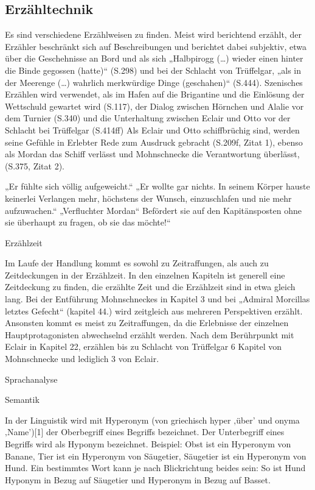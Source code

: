 \subsection{Erzähltechnik}

Es sind verschiedene Erzählweisen zu finden. Meist wird berichtend erzählt, der Erzähler beschränkt sich auf Beschreibungen und berichtet dabei  subjektiv, etwa über die Geschehnisse an Bord und als sich „Halbpirogg (…) wieder einen hinter die Binde gegossen (hatte)“ (S.298) und bei der Schlacht von Trüffelgar, „als in der Meerenge (…) wahrlich merkwürdige Dinge (geschahen)“ (S.444). Szenisches Erzählen wird verwendet, als im Hafen auf die Brigantine und die Einlösung der Wettschuld gewartet wird (S.117), der Dialog zwischen Hörnchen und Alalie vor dem Turnier (S.340) und die Unterhaltung zwischen Eclair und Otto vor der Schlacht bei Trüffelgar (S.414ff) Als Eclair und Otto schiffbrüchig sind, werden seine Gefühle in Erlebter Rede zum Ausdruck gebracht (S.209f, Zitat 1), ebenso als Mordan das Schiff verlässt und Mohnschnecke die Verantwortung überlässt,(S.375, Zitat 2).


„Er fühlte sich völlig aufgeweicht.“ „Er wollte gar nichts. In seinem Körper hauste keinerlei Verlangen mehr, höchstens der Wunsch, einzuschlafen und nie mehr aufzuwachen.“
„Verfluchter Mordan“ Befördert sie auf den Kapitänsposten ohne sie überhaupt zu fragen, ob sie das möchte!“

Erzählzeit

Im Laufe der Handlung kommt es sowohl zu Zeitraffungen, als auch zu Zeitdeckungen in der Erzählzeit. In den einzelnen Kapiteln ist generell eine Zeitdeckung zu finden, die erzählte Zeit und die Erzählzeit sind in etwa gleich lang. Bei der Entführung Mohnschneckes in Kapitel 3 und bei „Admiral Morcillas letztes Gefecht“ (kapitel 44.) wird zeitgleich aus mehreren Perspektiven erzählt. Ansonsten kommt es meist zu Zeitraffungen, da die Erlebnisse der einzelnen Hauptprotagonisten abwechselnd erzählt werden.  Nach dem Berührpunkt mit Eclair in Kapitel 22, erzählen bis zu Schlacht von Trüffelgar 6 Kapitel von Mohnschnecke und lediglich 3 von Eclair.

Sprachanalyse
 
Semantik


In der Linguistik wird mit Hyperonym (von griechisch hyper ‚über’ und onyma ‚Name’)[1] der Oberbegriff eines Begriffs bezeichnet. Der Unterbegriff eines Begriffs wird als Hyponym bezeichnet.
Beispiel: Obst ist ein Hyperonym von Banane, Tier ist ein Hyperonym von Säugetier, Säugetier ist ein Hyperonym von Hund.
Ein bestimmtes Wort kann je nach Blickrichtung beides sein: So ist Hund Hyponym in Bezug auf Säugetier und Hyperonym in Bezug auf Basset.


